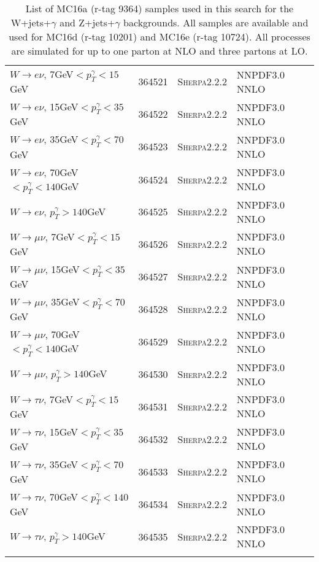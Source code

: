 \begin{table}[h!]
\begin{center}
{\begin{tabular}{@{} lcll @{}}
$W\rightarrow e\nu$, 7GeV$<p_T^\gamma<15$GeV & 364521& \textsc{Sherpa2.2.2} &NNPDF3.0 NNLO \\
$W\rightarrow e\nu$, 15GeV$<p_T^\gamma<35$GeV & 364522& \textsc{Sherpa2.2.2} &NNPDF3.0 NNLO \\
$W\rightarrow e\nu$, 35GeV$<p_T^\gamma<70$GeV & 364523& \textsc{Sherpa2.2.2} &NNPDF3.0 NNLO \\
$W\rightarrow e\nu$, 70GeV$<p_T^\gamma<140$GeV & 364524& \textsc{Sherpa2.2.2} &NNPDF3.0 NNLO \\
$W\rightarrow e\nu$, $p_T^\gamma>140$GeV & 364525& \textsc{Sherpa2.2.2} &NNPDF3.0 NNLO \\
$W\rightarrow \mu\nu$, 7GeV$<p_T^\gamma<15$GeV & 364526& \textsc{Sherpa2.2.2} &NNPDF3.0 NNLO \\
$W\rightarrow \mu\nu$, 15GeV$<p_T^\gamma<35$GeV & 364527& \textsc{Sherpa2.2.2} &NNPDF3.0 NNLO \\
$W\rightarrow \mu\nu$, 35GeV$<p_T^\gamma<70$GeV & 364528& \textsc{Sherpa2.2.2} &NNPDF3.0 NNLO \\
$W\rightarrow \mu\nu$, 70GeV$<p_T^\gamma<140$GeV & 364529& \textsc{Sherpa2.2.2} &NNPDF3.0 NNLO \\
$W\rightarrow \mu\nu$, $p_T^\gamma>140$GeV & 364530& \textsc{Sherpa2.2.2} &NNPDF3.0 NNLO \\
$W\rightarrow \tau\nu$, 7GeV$<p_T^\gamma<15$GeV & 364531& \textsc{Sherpa2.2.2} &NNPDF3.0 NNLO \\
$W\rightarrow \tau\nu$, 15GeV$<p_T^\gamma<35$GeV & 364532& \textsc{Sherpa2.2.2} &NNPDF3.0 NNLO \\
$W\rightarrow \tau\nu$, 35GeV$<p_T^\gamma<70$GeV & 364533& \textsc{Sherpa2.2.2} &NNPDF3.0 NNLO \\
$W\rightarrow \tau\nu$, 70GeV$<p_T^\gamma<140$GeV & 364534& \textsc{Sherpa2.2.2} &NNPDF3.0 NNLO \\
$W\rightarrow \tau\nu$, $p_T^\gamma>140$GeV & 364535& \textsc{Sherpa2.2.2} &NNPDF3.0 NNLO \\
 \hhline{====}
\end{tabular}
\caption{List of MC16a (r-tag  9364) samples used in this search for the W+jets+$\gamma$ and Z+jets+$\gamma$ backgrounds.  All samples are available and used for MC16d (r-tag 10201) and MC16e (r-tag 10724). All processes are simulated for up to one parton at NLO and three partons at LO.}
\label{tab:MCSample5}
}
\end{center}
\end{table}

